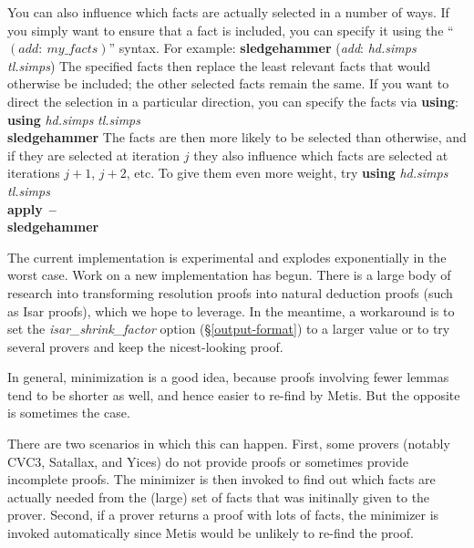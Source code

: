 \documentclass[a4paper,12pt]{article}
\begin{document}
You can also influence which facts are actually selected in a number of ways. If
you simply want to ensure that a fact is included, you can specify it using the
``$(\textit{add}{:}~\textit{my\_facts})$'' syntax. For example:
%
\prew
\textbf{sledgehammer} (\textit{add}: \textit{hd.simps} \textit{tl.simps})
\postw
%
The specified facts then replace the least relevant facts that would otherwise be
included; the other selected facts remain the same.
If you want to direct the selection in a particular direction, you can specify
the facts via \textbf{using}:
%
\prew
\textbf{using} \textit{hd.simps} \textit{tl.simps} \\
\textbf{sledgehammer}
\postw
%
The facts are then more likely to be selected than otherwise, and if they are
selected at iteration $j$ they also influence which facts are selected at
iterations $j + 1$, $j + 2$, etc. To give them even more weight, try
%
\prew
\textbf{using} \textit{hd.simps} \textit{tl.simps} \\
\textbf{apply}~\textbf{--} \\
\textbf{sledgehammer}
\postw


The current implementation is experimental and explodes exponentially in the
worst case. Work on a new implementation has begun. There is a large body of
research into transforming resolution proofs into natural deduction proofs (such
as Isar proofs), which we hope to leverage. In the meantime, a workaround is to
set the \textit{isar\_shrink\_factor} option (\S\ref{output-format}) to a larger
value or to try several provers and keep the nicest-looking proof.


In general, minimization is a good idea, because proofs involving fewer lemmas
tend to be shorter as well, and hence easier to re-find by Metis. But the
opposite is sometimes the case.


There are two scenarios in which this can happen. First, some provers (notably
CVC3, Satallax, and Yices) do not provide proofs or sometimes provide incomplete
proofs. The minimizer is then invoked to find out which facts are actually
needed from the (large) set of facts that was initinally given to the prover.
Second, if a prover returns a proof with lots of facts, the minimizer is invoked
automatically since Metis would be unlikely to re-find the proof.
\end{document}
